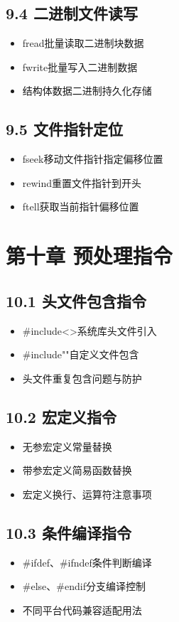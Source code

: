 \subsection*{9.4 二进制文件读写}
\begin{itemize}
\item fread批量读取二进制块数据
\item fwrite批量写入二进制数据
\item 结构体数据二进制持久化存储
\end{itemize}

\subsection*{9.5 文件指针定位}
\begin{itemize}
\item fseek移动文件指针指定偏移位置
\item rewind重置文件指针到开头
\item ftell获取当前指针偏移位置
\end{itemize}

\section*{第十章 预处理指令}
\subsection*{10.1 头文件包含指令}
\begin{itemize}
\item \#include<>系统库头文件引入
\item \#include""自定义文件包含
\item 头文件重复包含问题与防护
\end{itemize}

\subsection*{10.2 宏定义指令}
\begin{itemize}
\item 无参宏定义常量替换
\item 带参宏定义简易函数替换
\item 宏定义换行、运算符注意事项
\end{itemize}

\subsection*{10.3 条件编译指令}
\begin{itemize}
\item \#ifdef、\#ifndef条件判断编译
\item \#else、\#endif分支编译控制
\item 不同平台代码兼容适配用法
\end{itemize}


